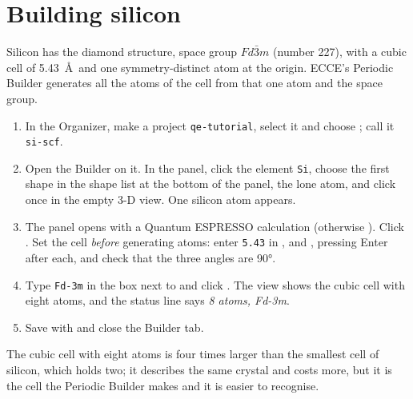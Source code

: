 \section{Building silicon}
Silicon has the diamond structure, space group $Fd\bar{3}m$ (number 227), with a cubic cell of 5.43~\AA\ and one symmetry-distinct atom at the origin. ECCE's Periodic Builder generates all the atoms of the cell from that one atom and the space group.
\begin{enumerate}
	\item In the Organizer, make a project \texttt{qe-tutorial}, select it and choose ; call it \texttt{si-scf}.
	\item Open the Builder on it. In the  panel, click the element \texttt{Si}, choose the first shape in the shape list at the bottom of the panel, the lone atom, and click once in the empty 3-D view. One silicon atom appears.
	\item The  panel opens with a Quantum ESPRESSO calculation (otherwise ). Click . Set the cell \emph{before} generating atoms: enter \texttt{5.43} in ,  and , pressing Enter after each, and check that the three angles are 90°.
	\item Type \texttt{Fd-3m} in the box next to  and click . The view shows the cubic cell with eight atoms, and the status line says \emph{8 atoms, Fd-3m}.
	\item Save with  and close the Builder tab.
\end{enumerate}
The cubic cell with eight atoms is four times larger than the smallest cell of silicon, which holds two; it describes the same crystal and costs more, but it is the cell the Periodic Builder makes and it is easier to recognise.

